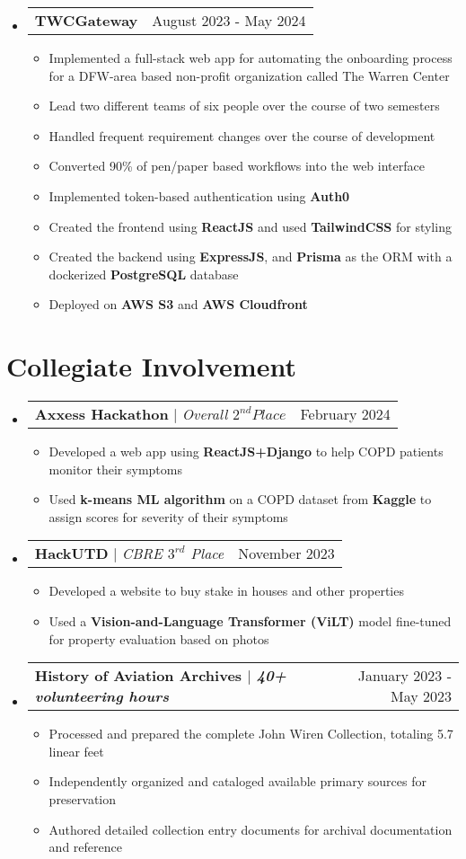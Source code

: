 \documentclass[letterpaper,11pt]{article}
\makeatletter
\newcommand{\resumeItem}[1]{
  \item\small{
    {#1 \vspace{-2pt}}
  }
}
\newcommand{\resumeProjectHeading}[2]{
    \item
    \begin{tabular*}{0.97\textwidth}{l@{\extracolsep{\fill}}r}
      \small#1 & #2 \\
    \end{tabular*}\vspace{-7pt}
}
\newcommand{\resumeSubHeadingListStart}{\begin{itemize}[leftmargin=0.15in, label={}]}
\newcommand{\resumeSubHeadingListEnd}{\end{itemize}}
\newcommand{\resumeItemListStart}{\begin{itemize}}
\newcommand{\resumeItemListEnd}{\end{itemize}\vspace{-5pt}}
\makeatother
\begin{document}
  \resumeSubHeadingListStart
  \resumeProjectHeading{\textbf{TWCGateway}}{August 2023 - May 2024}
    \resumeItemListStart
      \resumeItem{Implemented a full-stack web app for automating the onboarding process for a DFW-area based non-profit organization called The Warren Center}
      \resumeItem{Lead two different teams of six people over the course of two semesters}
      \resumeItem{Handled frequent requirement changes over the course of development}
      \resumeItem{Converted 90\% of pen/paper based workflows into the web interface}
      \resumeItem{Implemented token-based authentication using \textbf{Auth0}}
      \resumeItem{Created the frontend using \textbf{ReactJS} and used \textbf{TailwindCSS} for styling}
      \resumeItem{Created the backend using \textbf{ExpressJS}, and \textbf{Prisma} as the ORM with a dockerized \textbf{PostgreSQL} database}
      \resumeItem{Deployed on \textbf{AWS S3} and \textbf{AWS Cloudfront}}

    \resumeItemListEnd
  \resumeSubHeadingListEnd




\section{Collegiate Involvement}
  \resumeSubHeadingListStart
    \resumeProjectHeading{\textbf{Axxess Hackathon} $|$ \emph{Overall $2^{nd} Place$}}{February 2024}
      \resumeItemListStart
        \resumeItem{Developed a web app using \textbf{ReactJS+Django} to help COPD patients monitor their symptoms}
        \resumeItem{Used \textbf{k-means ML algorithm} on a COPD dataset from \textbf{Kaggle} to assign scores for severity of their symptoms }
      \resumeItemListEnd
    \resumeProjectHeading{\textbf{HackUTD} $|$ \emph{CBRE $3^{rd}$ Place}}{November 2023}
      \resumeItemListStart
        \resumeItem{Developed a website to buy stake in houses and other properties}
        \resumeItem{Used a \textbf{Vision-and-Language Transformer (ViLT)} model fine-tuned for property evaluation based on photos}
      \resumeItemListEnd
    \resumeProjectHeading{\textbf{History of Aviation Archives $|$ \emph{40+ volunteering hours}}}{January 2023 - May 2023}
      \resumeItemListStart
        \resumeItem{Processed and prepared the complete John Wiren Collection, totaling 5.7 linear feet}
        \resumeItem{Independently organized and cataloged available primary sources for preservation}
        \resumeItem{Authored detailed collection entry documents for archival documentation and reference}
      \resumeItemListEnd
  \resumeSubHeadingListEnd

\end{document}
